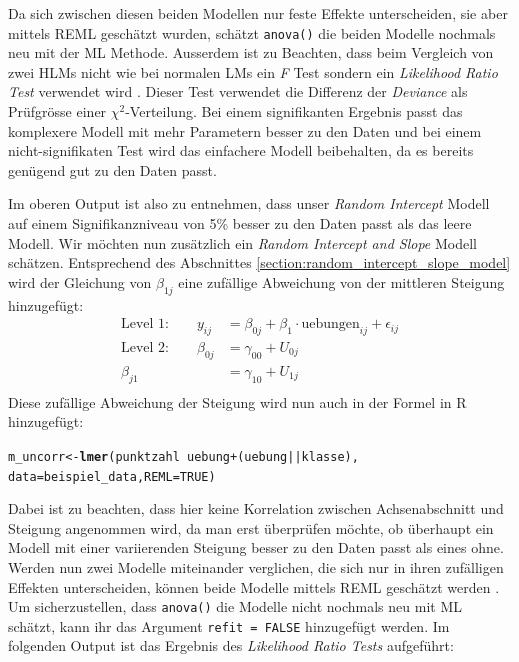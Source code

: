\documentclass[12pt]{article}\usepackage[]{graphicx}\usepackage[]{color}
\makeatletter
\newcommand{\hlnum}[1]{\textcolor[rgb]{0.686,0.059,0.569}{#1}}%
\newcommand{\hlopt}[1]{\textcolor[rgb]{0,0,0}{#1}}%
\newcommand{\hlstd}[1]{\textcolor[rgb]{0.345,0.345,0.345}{#1}}%
\newcommand{\hlkwb}[1]{\textcolor[rgb]{0.69,0.353,0.396}{#1}}%
\newcommand{\hlkwc}[1]{\textcolor[rgb]{0.333,0.667,0.333}{#1}}%
\newcommand{\hlkwd}[1]{\textcolor[rgb]{0.737,0.353,0.396}{\textbf{#1}}}%
\newenvironment{kframe}{%
 \def\at@end@of@kframe{}%
 \ifinner\ifhmode%
  \def\at@end@of@kframe{\end{minipage}}%
  \begin{minipage}{\columnwidth}%
 \fi\fi%
 \def\FrameCommand##1{\hskip\@totalleftmargin \hskip-\fboxsep
 \colorbox{shadecolor}{##1}\hskip-\fboxsep
     \hskip-\linewidth \hskip-\@totalleftmargin \hskip\columnwidth}%
 \MakeFramed {\advance\hsize-\width
   \@totalleftmargin\z@ \linewidth\hsize
   \@setminipage}}%
 {\par\unskip\endMakeFramed%
 \at@end@of@kframe}
\newenvironment{knitrout}{}{} %
\makeatother
\begin{document}
Da sich zwischen diesen beiden Modellen nur feste Effekte unterscheiden, sie aber mittels REML geschätzt wurden, schätzt \texttt{anova()} die beiden Modelle nochmals neu mit der ML Methode. Ausserdem ist zu Beachten, dass beim Vergleich von zwei HLMs nicht wie bei normalen LMs ein \textit{F} Test sondern ein \textit{Likelihood Ratio Test} verwendet wird \citep{PEUGH201085,SnijdersTomA.B2012Ma:a}. Dieser Test verwendet die Differenz der \textit{Deviance} als Prüfgrösse einer $\chi^2$-Verteilung. Bei einem signifikanten Ergebnis passt das komplexere Modell mit mehr Parametern besser zu den Daten und bei einem nicht-signifikaten Test wird das einfachere Modell beibehalten, da es bereits genügend gut zu den Daten passt.

Im oberen Output ist also zu entnehmen, dass unser \textit{Random Intercept} Modell auf einem Signifikanzniveau von 5\% besser zu den Daten passt als das leere Modell. Wir möchten nun zusätzlich ein \textit{Random Intercept and Slope} Modell schätzen. Entsprechend des Abschnittes \ref{section:random_intercept_slope_model} wird der Gleichung von $\beta_{1j}$ eine zufällige Abweichung von der mittleren Steigung hinzugefügt: 
\begin{equation} 
\begin{split}	
 \text{Level 1:}  \qquad y_{ij} & = \beta_{0j} + \beta_{1} \cdot \text{uebungen}_{ij} + \epsilon_{ij}\\
 \text{Level 2:} \qquad \beta_{0j} & = \gamma_{00} + U_{0j}\\
 \beta_{j1} & = \gamma_{10 }+ U_{1j}\\
\end{split}	
\end{equation} 
Diese zufällige Abweichung der Steigung wird nun auch in der Formel in R hinzugefügt:

\singlespacing
\begin{knitrout}
\color{fgcolor}\begin{kframe}
\begin{alltt}
\hlstd{m_uncorr} \hlkwb{<-} \hlkwd{lmer}\hlstd{(punktzahl} \hlopt{~} \hlstd{uebung} \hlopt{+} \hlstd{(uebung} \hlopt{||} \hlstd{klasse),}
        \hlkwc{data} \hlstd{= beispiel_data,} \hlkwc{REML} \hlstd{=} \hlnum{TRUE}\hlstd{)}
\end{alltt}
\end{kframe}
\end{knitrout}

Dabei ist zu beachten, dass hier keine Korrelation zwischen Achsenabschnitt und Steigung angenommen wird, da man erst überprüfen möchte, ob überhaupt ein Modell mit einer variierenden Steigung besser zu den Daten passt als eines ohne. Werden nun zwei Modelle miteinander verglichen, die sich nur in ihren zufälligen Effekten unterscheiden, können beide Modelle mittels REML geschätzt werden \citep{PEUGH201085}. Um sicherzustellen, dass \texttt{anova()} die Modelle nicht nochmals neu mit ML schätzt, kann ihr das Argument \texttt{refit = FALSE} hinzugefügt werden. Im folgenden Output ist das Ergebnis des \textit{Likelihood Ratio Tests} aufgeführt:
\end{document}
